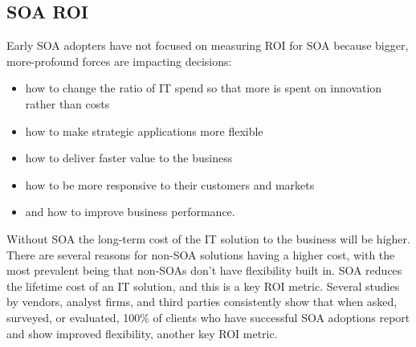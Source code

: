 \documentclass[12pt,a4paper,final,twoside,onecolumn,titlepage]{book}
\begin{document}
\subsection{SOA ROI}
Early \gls{SOA} adopters have not focused on measuring \gls{ROI} for \gls{SOA} because bigger, more-profound forces are impacting decisions:
\begin{itemize}
\item how to change the ratio of IT spend so that more is spent on innovation rather than costs
\item how to make strategic applications more flexible
\item how to deliver faster value to the business
\item how to be more responsive to their customers and markets
\item and how to improve business performance.
\end{itemize}
Without \gls{SOA} the long-term cost of the IT solution to the business will be higher. There are several reasons for non-\gls{SOA} solutions having a higher cost, with the most prevalent being that non-\gls{SOA}s don’t have flexibility built in. \gls{SOA} reduces the lifetime cost of an IT solution, and this is a key \gls{ROI} metric. Several studies by vendors, analyst firms, and third parties consistently show that when asked, surveyed, or evaluated, 100\% of clients who have successful \gls{SOA} adoptions report and show improved flexibility, another key ROI metric.
\end{document}
